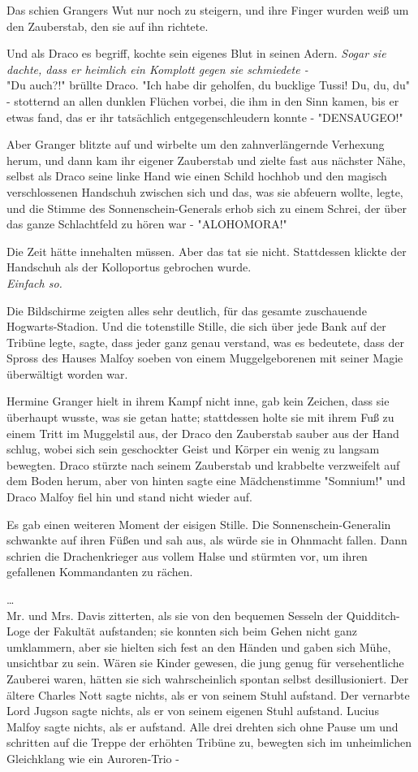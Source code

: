 {Das schien Grangers Wut nur noch zu steigern, und ihre Finger wurden weiß um den Zauberstab, den sie auf ihn richtete.

Und als Draco es begriff, kochte sein eigenes Blut in seinen Adern. \emph{Sogar sie dachte, dass er heimlich ein Komplott gegen sie schmiedete -}\\ "Du auch?!" brüllte Draco. "Ich habe dir geholfen, du bucklige Tussi! Du, du, du" - stotternd an allen dunklen Flüchen vorbei, die ihm in den Sinn kamen, bis er etwas fand, das er ihr tatsächlich entgegenschleudern konnte - "DENSAUGEO!"

Aber Granger blitzte auf und wirbelte um den zahnverlängernde Verhexung herum, und dann kam ihr eigener Zauberstab und zielte fast aus nächster Nähe, selbst als Draco seine linke Hand wie einen Schild hochhob und den magisch verschlossenen Handschuh zwischen sich und das, was sie abfeuern wollte, legte, und die Stimme des Sonnenschein-Generals erhob sich zu einem Schrei, der über das ganze Schlachtfeld zu hören war - "ALOHOMORA!"

Die Zeit hätte innehalten müssen. Aber das tat sie nicht. Stattdessen klickte der Handschuh als der Kolloportus gebrochen wurde.\\ \emph{Einfach so.}

Die Bildschirme zeigten alles sehr deutlich, für das gesamte zuschauende Hogwarts-Stadion. Und die totenstille Stille, die sich über jede Bank auf der Tribüne legte, sagte, dass jeder ganz genau verstand, was es bedeutete, dass der Spross des Hauses Malfoy soeben von einem Muggelgeborenen mit seiner Magie überwältigt worden war.

Hermine Granger hielt in ihrem Kampf nicht inne, gab kein Zeichen, dass sie überhaupt wusste, was sie getan hatte; stattdessen holte sie mit ihrem Fuß zu einem Tritt im Muggelstil aus, der Draco den Zauberstab sauber aus der Hand schlug, wobei sich sein geschockter Geist und Körper ein wenig zu langsam bewegten. Draco stürzte nach seinem Zauberstab und krabbelte verzweifelt auf dem Boden herum, aber von hinten sagte eine Mädchenstimme "Somnium!" und Draco Malfoy fiel hin und stand nicht wieder auf.

Es gab einen weiteren Moment der eisigen Stille. Die Sonnenschein-Generalin schwankte auf ihren Füßen und sah aus, als würde sie in Ohnmacht fallen. Dann schrien die Drachenkrieger aus vollem Halse und stürmten vor, um ihren gefallenen Kommandanten zu rächen.

…\\ Mr. und Mrs. Davis zitterten, als sie von den bequemen Sesseln der Quidditch-Loge der Fakultät aufstanden; sie konnten sich beim Gehen nicht ganz umklammern, aber sie hielten sich fest an den Händen und gaben sich Mühe, unsichtbar zu sein. Wären sie Kinder gewesen, die jung genug für versehentliche Zauberei waren, hätten sie sich wahrscheinlich spontan selbst desillusioniert. Der ältere Charles Nott sagte nichts, als er von seinem Stuhl aufstand. Der vernarbte Lord Jugson sagte nichts, als er von seinem eigenen Stuhl aufstand. Lucius Malfoy sagte nichts, als er aufstand. Alle drei drehten sich ohne Pause um und schritten auf die Treppe der erhöhten Tribüne zu, bewegten sich im unheimlichen Gleichklang wie ein Auroren-Trio -

}
